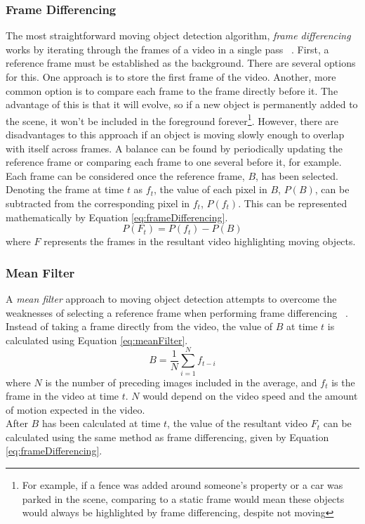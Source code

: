 \setlength{\leftskip}{0cm}
\subsubsection{Frame Differencing}
\setlength{\leftskip}{0.5cm}
\indent \indent
The most straightforward moving object detection algorithm, \textit{frame differencing} works by iterating through the frames of a video in a single pass ~\cite{FrameDifferencing}. First, a reference frame must be established as the background. There are several options for this. One approach is to store the first frame of the video. Another, more common option is to compare each frame to the frame directly before it. The advantage of this is that it will evolve, so if a new object is permanently added to the scene, it won't be included in the foreground forever\footnote{For example, if a fence was added around someone's property or a car was parked in the scene, comparing to a static frame would mean these objects would always be highlighted by frame differencing, despite not moving}. However, there are disadvantages to this approach if an object is moving slowly enough to overlap with itself across frames. A balance can be found by periodically updating the reference frame or comparing each frame to one several before it, for example.
\smallskip \\ \indent
Each frame can be considered once the reference frame, $B$, has been selected. Denoting the frame at time $t$ as $f_t$, the value of each pixel in $B$, $P(B)$, can be subtracted from the corresponding pixel in $f_t$, $P(f_t)$. This can be represented mathematically by Equation \ref{eq:frameDifferencing}.
\begin{equation}
    \label{eq:frameDifferencing}
    P(F_t) = P(f_t) - P(B)
\end{equation}
where $F$ represents the frames in the resultant video highlighting moving objects.

\setlength{\leftskip}{0cm}
\subsubsection{Mean Filter}
\setlength{\leftskip}{0.5cm}
\indent \indent
A \textit{mean filter} approach to moving object detection attempts to overcome the weaknesses of selecting a reference frame when performing frame differencing ~\cite{MeanFilter}. Instead of taking a frame directly from the video, the value of $B$ at time $t$ is calculated using Equation \ref{eq:meanFilter}.
\begin{equation}
    \label{eq:meanFilter}
    B = \frac{1}{N} \sum^N_{i=1} f_{t-i}
\end{equation}
where $N$ is the number of preceding images included in the average, and $f_t$ is the frame in the video at time $t$. $N$ would depend on the video speed and the amount of motion expected in the video.
\smallskip \\ \indent
After $B$ has been calculated at time $t$, the value of the resultant video $F_t$ can be calculated using the same method as frame differencing, given by Equation \ref{eq:frameDifferencing}.


